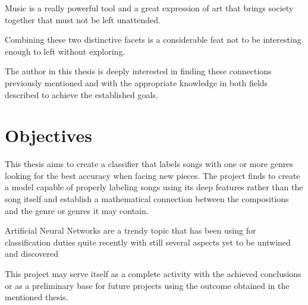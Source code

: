 Music is a really powerful tool and a great expression of art that brings society together that must not be left unattended.

Combining these two distinctive facets is a considerable feat not to be interesting enough to left without exploring.

The author in this thesis is deeply interested in finding these connections previously mentioned and with the appropriate knowledge in both fields described to achieve the established goals.
\newpage

\section{Objectives}
This thesis aims to create a classifier that labels songs with one or more genres looking for the best accuracy when facing new pieces. The project finds to create a model capable of properly labeling songs using its deep features rather than the song itself and establish a mathematical connection between the compositions and the genre or genres it may contain.

Artificial Neural Networks are a trendy topic that has been using for classification duties quite recently with still several aspects yet to be untwined and discovered

This project may serve itself as a complete activity with the achieved conclusions or as a preliminary base for future projects using the outcome obtained in the mentioned thesis.
